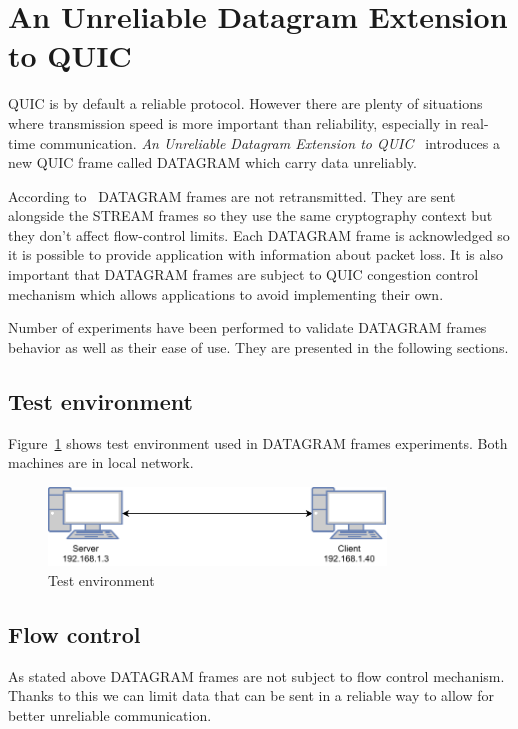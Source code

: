 \section{An Unreliable Datagram Extension to QUIC}
\label{sec:datagrams}
QUIC is by default a reliable protocol.
However there are plenty of situations where transmission speed is more important than reliability, especially in real-time communication.
\textit{An Unreliable Datagram Extension to QUIC}~\cite{ietf-quic-datagram-02} introduces a new QUIC frame called DATAGRAM which carry data unreliably.

According to~\cite{ietf-quic-datagram-02} DATAGRAM frames are not retransmitted.
They are sent alongside the STREAM frames so they use the same cryptography context but they don't affect flow-control limits.
Each DATAGRAM frame is acknowledged so it is possible to provide application with information about packet loss.
It is also important that DATAGRAM frames are subject to QUIC congestion control mechanism which allows applications to avoid implementing their own.

Number of experiments have been performed to validate DATAGRAM frames behavior as well as their ease of use.
They are presented in the following sections.

\subsection{Test environment}
\label{subsec:test-env}
Figure~\ref{fig:dgram_test_env} shows test environment used in DATAGRAM frames experiments.
Both machines are in local network.

\begin{figure}
    \centering
    \includegraphics[width=0.8\textwidth]{img/__09__datagrams/dgram_test_env.pdf}
    \caption{Test environment}
    \label{fig:dgram_test_env}
\end{figure}

\subsection{Flow control}
\label{subsec:flow-control}
As stated above DATAGRAM frames are not subject to flow control mechanism.
Thanks to this we can limit data that can be sent in a reliable way to allow for better unreliable communication.

